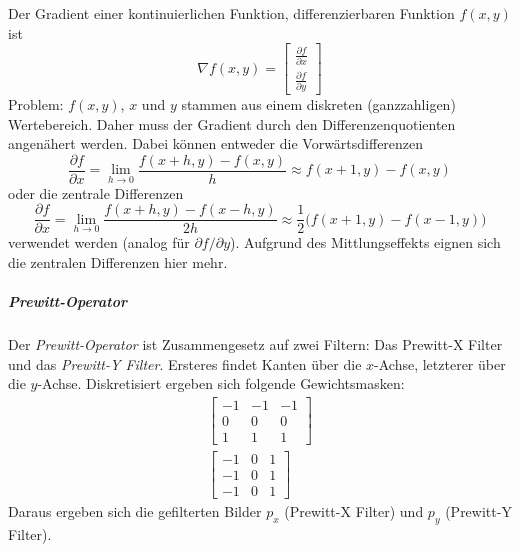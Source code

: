 					Der Gradient einer kontinuierlichen Funktion, differenzierbaren Funktion \( f(x, y) \) ist
					\begin{equation*}
						\nabla f(x, y) =
							\begin{bmatrix}
								\frac{\partial f}{\partial x} \\
								\frac{\partial f}{\partial y}
							\end{bmatrix}
					\end{equation*}
					Problem: \( f(x, y) \), \(x\) und \(y\) stammen aus einem diskreten (ganzzahligen) Wertebereich. Daher muss der Gradient durch den Differenzenquotienten angenähert werden. Dabei können entweder die Vorwärtsdifferenzen
					\begin{equation*}
						\frac{\partial f}{\partial x} = \lim\limits_{h \to 0} \frac{f(x + h, y) - f(x, y)}{h} \approx f(x + 1, y) - f(x, y)
					\end{equation*}
					oder die zentrale Differenzen
					\begin{equation*}
						\frac{\partial f}{\partial x} = \lim\limits_{h \to 0} \frac{f(x + h, y) - f(x - h, y)}{2h} \approx \frac{1}{2} \big( f(x + 1, y) - f(x - 1, y) \big)
					\end{equation*}
					verwendet werden (analog für \( \partial f / \partial y \)). Aufgrund des Mittlungseffekts eignen sich die zentralen Differenzen hier mehr.

					\subparagraph{Prewitt-Operator} %
						Der \emph{Prewitt-Operator} ist Zusammengesetz auf zwei Filtern: Das Prewitt-X Filter und das \emph{Prewitt-Y Filter}. Ersteres findet Kanten über die \(x\)-Achse, letzterer über die \(y\)-Achse. Diskretisiert ergeben sich folgende Gewichtsmasken:
						\begin{gather*}
							\begin{bmatrix}
								-1 & -1 & -1 \\
								0  & 0  & 0  \\
								1  & 1  & 1
							\end{bmatrix} \tag{Prewitt-X Filter} \\
							\begin{bmatrix}
								-1 & 0 & 1 \\
								-1 & 0 & 1 \\
								-1 & 0 & 1
							\end{bmatrix} \tag{Prewitt-Y Filter}
						\end{gather*}
						Daraus ergeben sich die gefilterten Bilder \(p_x\) (Prewitt-X Filter) und \(p_y\) (Prewitt-Y Filter).
						
